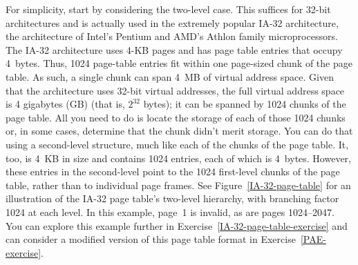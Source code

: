 For simplicity, start by considering the two-level case.  This suffices
for 32-bit architectures and is actually used in the extremely
popular IA-32 architecture, the architecture of Intel's Pentium and
AMD's Athlon family microprocessors.  The IA-32 architecture uses 4-KB
pages and has page table entries that occupy 4~bytes.  Thus, 1024
page-table entries fit within one page-sized chunk of the page table.
As such, a single chunk can span 4~MB of virtual address space.  Given
that the architecture uses 32-bit virtual addresses, the full virtual address space
is 4 gigabytes (GB) (that is, $2^{32}$ bytes); it can be spanned by 1024 chunks of the
page table.  All you need to do is locate the storage of each of those
1024 chunks or, in some cases, determine that the chunk didn't merit
storage.  You can do that using a second-level structure, much like
each of the chunks of the page table.  It, too, is 4~KB in size and
contains 1024 entries, each of which is 4~bytes.  However, these entries in
the second-level  point to the 1024 first-level
chunks of the page table, rather than to individual page frames.  See
Figure~\ref{IA-32-page-table} for an illustration of the
IA-32 page table's  two-level hierarchy, with
branching factor 1024 at each level.  In this example, page~1
is invalid, as are pages 1024--2047.  You can explore this
example further in Exercise~\ref{IA-32-page-table-exercise} and can
consider a modified version of this page table format in Exercise~\ref{PAE-exercise}.
